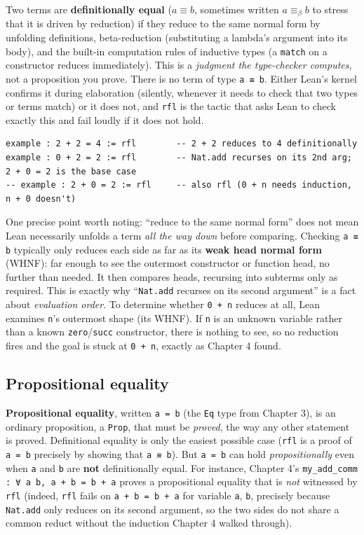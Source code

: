 Two terms are \textbf{definitionally equal} (\(a \equiv b\), sometimes written \(a \equiv_\beta b\) to stress that it is driven by reduction) if they reduce to the same normal form by unfolding definitions, beta-reduction (substituting a lambda's argument into its body), and the built-in computation rules of inductive types (a \texttt{match} on a constructor reduces immediately). This is a \emph{judgment the type-checker computes}, not a proposition you prove. There is no term of type \texttt{a ≡ b}. Either Lean's kernel confirms it during elaboration (silently, whenever it needs to check that two types or terms match) or it does not, and \texttt{rfl} is the tactic that asks Lean to check exactly this and fail loudly if it does not hold.

\begin{lstlisting}
example : 2 + 2 = 4 := rfl        -- 2 + 2 reduces to 4 definitionally
example : 0 + 2 = 2 := rfl        -- Nat.add recurses on its 2nd arg; 2 + 0 = 2 is the base case
-- example : 2 + 0 = 2 := rfl     -- also rfl (0 + n needs induction, n + 0 doesn't)
\end{lstlisting}

One precise point worth noting: ``reduce to the same normal form'' does not mean Lean necessarily unfolds a term \emph{all the way down} before comparing. Checking \texttt{a ≡ b} typically only reduces each side as far as its \textbf{weak head normal form} (WHNF): far enough to see the outermost constructor or function head, no further than needed. It then compares heads, recursing into subterms only as required. This is exactly why ``\texttt{Nat.add} recurses on its second argument'' is a fact about \emph{evaluation order}. To determine whether \texttt{0 + n} reduces at all, Lean examines \texttt{n}'s outermost shape (its WHNF). If \texttt{n} is an unknown variable rather than a known \texttt{zero}/\texttt{succ} constructor, there is nothing to see, so no reduction fires and the goal is stuck at \texttt{0 + n}, exactly as Chapter 4 found.

\subsection{Propositional equality}\label{sec:05-rigor-check:04-defeq-vs-propeq:4}

\textbf{Propositional equality}, written \texttt{a = b} (the \texttt{Eq} type from Chapter 3), is an ordinary proposition, a \texttt{Prop}, that must be \emph{proved}, the way any other statement is proved. Definitional equality is only the easiest possible case (\texttt{rfl} is a proof of \texttt{a = b} precisely by showing that \texttt{a ≡ b}). But \texttt{a = b} can hold \emph{propositionally} even when \texttt{a} and \texttt{b} are \textbf{not} definitionally equal. For instance, Chapter 4's \texttt{my\_\allowbreak{}add\_\allowbreak{}comm : ∀ a b, a + b = b + a} proves a propositional equality that is \emph{not} witnessed by \texttt{rfl} (indeed, \texttt{rfl} fails on \texttt{a + b = b + a} for variable \texttt{a}, \texttt{b}, precisely because \texttt{Nat.add} only reduces on its second argument, so the two sides do not share a common reduct without the induction Chapter 4 walked through).

